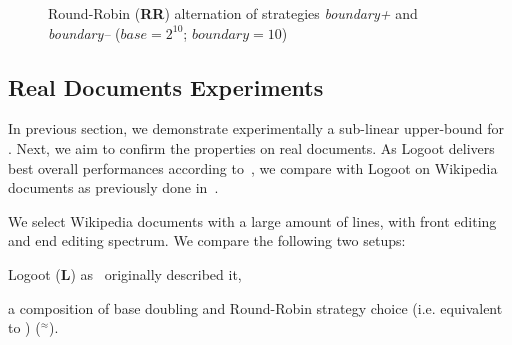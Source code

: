 \begin{figure}
\small
\begin{center}

\caption{Round-Robin (\textbf{RR}) alternation of strategies \emph{boundary+}
  and \emph{boundary--} ($base=2^{10}$; $boundary=10$)}
\label{fig:roundrobinexperiment}
\end{center}
\end{figure}

\subsection{Real Documents Experiments}

In previous section, we demonstrate experimentally a sub-linear upper-bound for
\NAME{}. Next, we aim to confirm the \NAME{} properties on real documents. As
Logoot delivers best overall performances according
to~\cite{ahmed2011evaluating}, we compare \NAME{} with Logoot on Wikipedia
documents as previously done in~\cite{DBLP:journals/tpds/WeissUM10}.

We select Wikipedia documents with a large amount of lines, with front editing
and end editing spectrum. We compare the following two setups:
\begin{inparaenum}[(1)]
  \item Logoot (\textbf{L}) as~\cite{weiss2009logoot} originally described it,
  \item a composition of base doubling and Round-Robin strategy choice
    (i.e. equivalent to \NAME{}) (\textbf{\NAME{}}$^\approx$).
\end{inparaenum}

